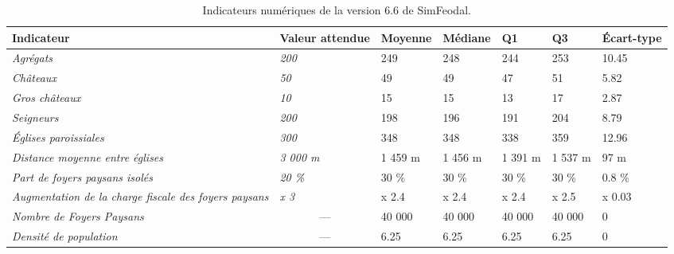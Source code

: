 \begin{table}[H]
	\captionsetup{singlelinecheck=off}
	\centering
	\small
	{\renewcommand{\arraystretch}{1.3}%
	\begin{tabular}{|p{3cm}|p{2.2cm}|p{1.5cm}|p{1.5cm}|p{1.5cm}|p{1.5cm}|p{1.5cm}|}
		\hline
		\textbf{Indicateur} & \textbf{Valeur} \textbf{attendue}\footnotemark & \textbf{Moyenne} & \textbf{Médiane} & \textbf{Q1} & \textbf{Q3} & \textbf{Écart-type} \\ \hline
		\textit{Agrégats} & \textit{200} & 249 & 248 & 244 & 253 & 10.45 \\ \hline
		\rowcolor[HTML]{DCDCDC} \textit{Châteaux} & \textit{50} & 49 & 49 & 47 & 51 & 5.82 \\ \hline
		\textit{Gros châteaux} & \textit{10} & 15 & 15 & 13 & 17 & 2.87 \\ \hline
		\rowcolor[HTML]{DCDCDC} \textit{Seigneurs} & \textit{200} & 198 & 196 & 191 & 204 & 8.79 \\ \hline
		\textit{Églises paroissiales} & \textit{300} & 348 & 348 & 338 & 359 & 12.96 \\ \hline
		\textit{Distance moyenne entre églises} & \textit{3 000 m} & 1 459 m & 1 456 m & 1 391 m & 1 537 m & 97 m \\ \hline
		\textit{Part de foyers paysans isolés} & \textit{20 \%} & 30 \% & 30 \% & 30 \% & 30 \% & 0.8 \% \\ \hline
		\textit{Augmentation de la charge fiscale des foyers paysans} & \textit{x 3} & x 2.4 & x 2.4 & x 2.4 & x 2.5 & x 0.03 \\ \hline
		\rowcolor[HTML]{DCDCDC} \textit{Nombre de Foyers Paysans} & \multicolumn{1}{c|}{---} & 40 000 & 40 000 & 40 000 & 40 000 & 0 \\ \hline
		\rowcolor[HTML]{DCDCDC} \textit{Densité de population} & \multicolumn{1}{c|}{---} & 6.25 & 6.25 & 6.25 & 6.25 & 0 \\ \hline
	\end{tabular}}
	\caption{Indicateurs numériques de la version 6.6 de SimFeodal.}
	\label{tab:results-basique}
\end{table}
